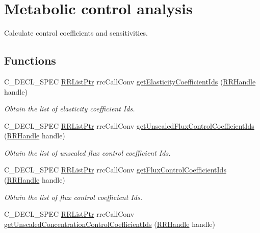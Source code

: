 \hypertarget{group__mca}{}\section{Metabolic control analysis}
\label{group__mca}


Calculate control coefficients and sensitivities.  


\subsection*{Functions}
\begin{DoxyCompactItemize}
\item 
C\+\_\+\+D\+E\+C\+L\+\_\+\+S\+P\+E\+C \hyperlink{rrc__types_8h_a32a8a60ac06858ff3a791672bd2bec73}{R\+R\+List\+Ptr} rrc\+Call\+Conv \hyperlink{group__mca_ga344045fc1136134e90c716343ac06f9a}{get\+Elasticity\+Coefficient\+Ids} (\hyperlink{rrc__types_8h_a1d68f0592372208fa5a5f2799ea4b3ae}{R\+R\+Handle} handle)
\begin{DoxyCompactList}\small\item\em Obtain the list of elasticity coefficient Ids. \end{DoxyCompactList}\item 
C\+\_\+\+D\+E\+C\+L\+\_\+\+S\+P\+E\+C \hyperlink{rrc__types_8h_a32a8a60ac06858ff3a791672bd2bec73}{R\+R\+List\+Ptr} rrc\+Call\+Conv \hyperlink{group__mca_gaaaf6b7d6da161d1a64fea9e0ce9c2843}{get\+Unscaled\+Flux\+Control\+Coefficient\+Ids} (\hyperlink{rrc__types_8h_a1d68f0592372208fa5a5f2799ea4b3ae}{R\+R\+Handle} handle)
\begin{DoxyCompactList}\small\item\em Obtain the list of unscaled flux control coefficient Ids. \end{DoxyCompactList}\item 
C\+\_\+\+D\+E\+C\+L\+\_\+\+S\+P\+E\+C \hyperlink{rrc__types_8h_a32a8a60ac06858ff3a791672bd2bec73}{R\+R\+List\+Ptr} rrc\+Call\+Conv \hyperlink{group__mca_ga3031fcbb6954adaa81ac6f8574c5dc33}{get\+Flux\+Control\+Coefficient\+Ids} (\hyperlink{rrc__types_8h_a1d68f0592372208fa5a5f2799ea4b3ae}{R\+R\+Handle} handle)
\begin{DoxyCompactList}\small\item\em Obtain the list of flux control coefficient Ids. \end{DoxyCompactList}\item 
C\+\_\+\+D\+E\+C\+L\+\_\+\+S\+P\+E\+C \hyperlink{rrc__types_8h_a32a8a60ac06858ff3a791672bd2bec73}{R\+R\+List\+Ptr} rrc\+Call\+Conv \hyperlink{group__mca_ga869f3496c8a786a1af0018cf9a98ec16}{get\+Unscaled\+Concentration\+Control\+Coefficient\+Ids} (\hyperlink{rrc__types_8h_a1d68f0592372208fa5a5f2799ea4b3ae}{R\+R\+Handle} handle)

\end{DoxyCompactItemize}

